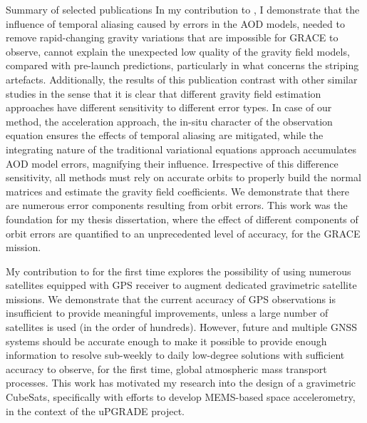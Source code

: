 \begin{cvtext}{Summary of selected publications}
In my contribution to \cite{Ditmar2012}, I demonstrate that the influence of temporal aliasing caused by errors in the \ac{AOD} models, needed to remove rapid-changing gravity variations that are impossible for \ac{GRACE} to observe, cannot explain the unexpected low quality of the gravity field models, compared with pre-launch predictions, particularly in what concerns the striping artefacts.
Additionally, the results of this publication contrast with other similar studies in the sense that it is clear that different gravity field estimation approaches have different sensitivity to different error types.
In case of our method, the acceleration approach, the in-situ character of the observation equation ensures the effects of temporal aliasing are mitigated, while the integrating nature of the traditional variational equations approach accumulates \ac{AOD} model errors, magnifying their influence.
Irrespective of this difference sensitivity, all methods must rely on accurate orbits to properly build the normal matrices and estimate the gravity field coefficients.
We demonstrate that there are numerous error components resulting from orbit errors.
This work was the foundation for my thesis dissertation, where the effect of different components of orbit errors are quantified to an unprecedented level of accuracy, for the \ac{GRACE} mission.

My contribution to \cite{Gunter2011} for the first time explores the possibility of using numerous satellites equipped with \ac{GPS} receiver to augment dedicated gravimetric satellite missions.
We demonstrate that the current accuracy of \ac{GPS} observations is insufficient to provide meaningful improvements, unless a large number of satellites is used (in the order of hundreds).
However, future and multiple \ac{GNSS} systems should be accurate enough to make it possible to provide enough information to resolve sub-weekly to daily low-degree solutions with sufficient accuracy to observe, for the first time, global atmospheric mass transport processes.
This work has motivated my research into the design of a gravimetric CubeSats, specifically with efforts to develop \ac{MEMS}-based space accelerometry, in the context of the uPGRADE project.


\vspace{2ex}
\begin{refsection}
\nocite{
TeixeiradaEncarnacao2020,
TeixeiraEncarnacao2019,
TeixeiraEncarnacao2016,
Ditmar2012,
Gunter2011,
}
\togglefalse{bbx:url}
\printbibliography
\end{refsection}

\end{cvtext}